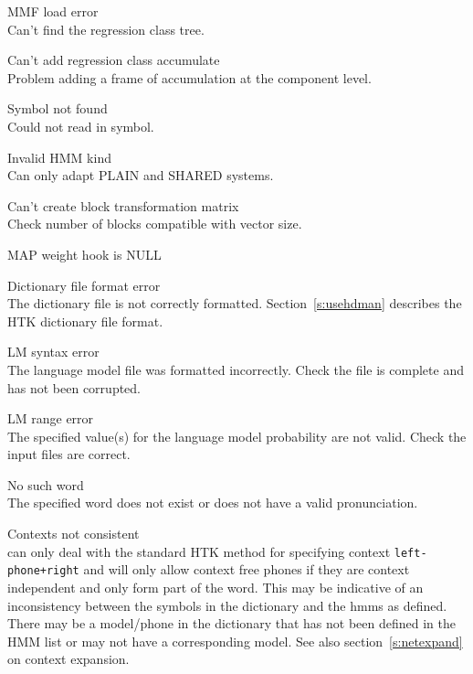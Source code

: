 \begin{itemize}
\begin{itemize}
 MMF load error\\
        Can't find the regression class tree.

 Can't add regression class accumulate\\
        Problem adding a frame of accumulation at the component level.

 Symbol not found\\
        Could not read in symbol.

 Invalid HMM kind\\
        Can only adapt PLAIN and SHARED systems.

 Can't create block transformation matrix\\
        Check number of blocks compatible with vector size.

 MAP weight hook is NULL\\

\end{itemize}


\begin{itemize}
    Dictionary file format error\\
        The dictionary file is not correctly formatted.  
        Section~\ref{s:usehdman} describes the HTK dictionary file format.

\end{itemize}


\begin{itemize}
    LM syntax error\\
        The language model file was formatted incorrectly.  Check the file is
        complete and has not been corrupted.

 LM range error\\
        The specified value(s) for the language model probability are not 
        valid.  Check the input files are correct.

\end{itemize}


\begin{itemize}
    No such word\\
        The specified word does not exist or does not have a valid 
        pronunciation.

    Contexts not consistent\\
         can only deal with the standard HTK method for specifying
        context \texttt{left-phone+right} and will only allow context free 
        phones if they are context independent and only form part of the word.
        This may be indicative of an inconsistency between the symbols in the dictionary
        and the hmms as defined. There may be a model/phone in the dictionary that has 
        not been defined in the HMM list or may not have a corresponding model.
        See also section~\ref{s:netexpand}  on context expansion.



\end{itemize}
\end{itemize}
